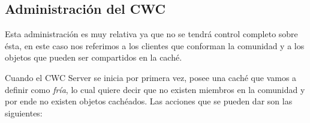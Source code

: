 
\subsection{Administración del CWC}

Esta administración es muy relativa ya que no se tendrá control completo sobre ésta, en este caso nos referimos a los clientes que conforman la comunidad y a los objetos que pueden ser compartidos en la caché.

Cuando el CWC Server se inicia por primera vez, posee una caché que vamos a definir como \textit{fría}, lo cual quiere decir que no existen miembros en la comunidad y por ende no existen objetos cachéados. Las acciones que se pueden dar son las siguientes:


